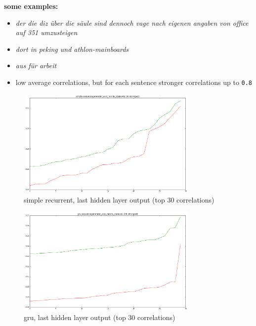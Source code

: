 \begin{frame}{\expv}
\textbf{some examples:}
\begin{itemize}

\item \textit{der die diz über die säule sind dennoch vage nach eigenen angaben von office auf 351 umzusteigen}

\item \textit{dort in peking und athlon-mainboards}

\item \textit{aus für arbeit}
\end{itemize}

\end{frame}
\begin{frame}{\expv}
	\begin{itemize}
		\item low average correlations, but for each sentence stronger correlations up to \texttt{0.8}
	\end{itemize}
\end{frame}
\begin{frame}{\expv}
	\begin{figure}
		\includegraphics[width=250pt,height=150pt]{gfx/simplernn.png}
		\caption{simple recurrent, last hidden layer output (top 30 correlations)}
	\end{figure}
\end{frame}
\begin{frame}{\expv}
	\begin{figure}
		\includegraphics[width=250pt,height=150pt]{gfx/gru.png}
		\caption{gru, last hidden layer output (top 30 correlations)}
	\end{figure}
\end{frame}
